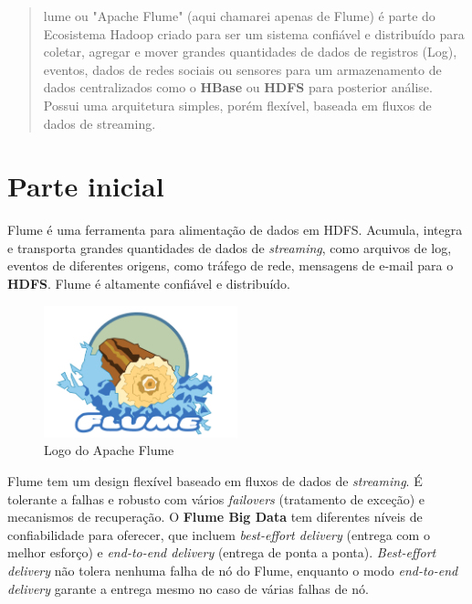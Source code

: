 \documentclass[a4paper,11pt]{article}
\begin{document}
	
	\maketitle %
	\thispagestyle{fancy} %
	
\begin{abstract}
	lume\cite{flumeoficial} ou "Apache Flume" (aqui chamarei apenas de Flume) é parte do Ecosistema Hadoop criado para ser um sistema confiável e distribuído para coletar, agregar e mover grandes quantidades de dados de registros (Log), eventos, dados de redes sociais ou sensores para um armazenamento de dados centralizados como o \textbf{HBase} ou \textbf{HDFS} para posterior análise. Possui uma arquitetura simples, porém flexível, baseada em fluxos de dados de streaming.
\end{abstract}

\section{Parte inicial}
Flume é uma ferramenta para alimentação de dados em HDFS. Acumula, integra e transporta grandes quantidades de dados de \textit{streaming}, como arquivos de log, eventos de diferentes origens, como tráfego de rede, mensagens de e-mail para o \textbf{HDFS}. Flume é altamente confiável e distribuído. 
\begin{figure}[H]
	\centering
	\includegraphics[width=0.5\textwidth]{imagem/logo}
	\caption{Logo do Apache Flume}
\end{figure}

Flume tem um design flexível baseado em fluxos de dados de \textit{streaming}. É tolerante a falhas e robusto com vários \textit{failovers} (tratamento de exceção) e mecanismos de recuperação. O \textbf{Flume Big Data} tem diferentes níveis de confiabilidade para oferecer, que incluem \textit{best-effort delivery} (entrega com o melhor esforço) e \textit{end-to-end delivery} (entrega de ponta a ponta). \textit{Best-effort delivery} não tolera nenhuma falha de nó do Flume, enquanto o modo \textit{end-to-end delivery} garante a entrega mesmo no caso de várias falhas de nó.
\end{document}
